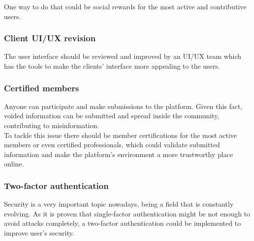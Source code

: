 One way to do that could be social rewards for the most active and contributive users.

\subsubsection{Client UI/UX revision}

The user interface should be reviewed and improved by an UI/UX team which has the tools to make the clients' 
interface more appealing to the users.

\subsubsection{Certified members}

Anyone can participate and make submissions to the platform. Given this fact, voided information
can be submitted and spread inside the community, contributing to misinformation.\\

To tackle this issue there should be member certifications for the most active members or even
certified professionals, which could validate submitted information and make the platform's
environment a more trustworthy place online.

\subsubsection{Two-factor authentication}

Security is a very important topic nowadays, being a field that is constantly evolving. As it is proven
that single-factor authentication might be not enough to avoid attacks completely, a two-factor authentication
could be implemented to improve user's security.

